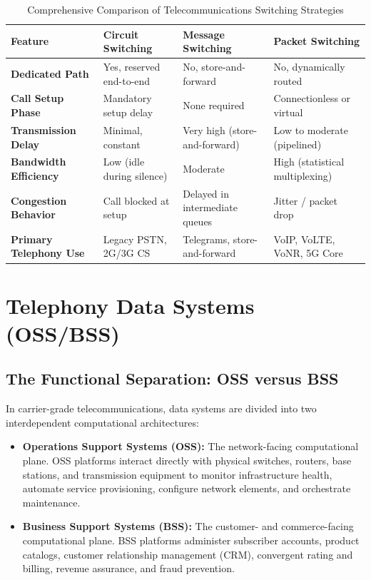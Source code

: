 \documentclass[12pt,a4paper]{report}
\begin{document}
\begin{table}[H]
\centering
\small
\renewcommand{\arraystretch}{1.3}
\begin{tabularx}{\textwidth}{|>{\bfseries}p{3.2cm}|>{\raggedright\arraybackslash}X|>{\raggedright\arraybackslash}X|>{\raggedright\arraybackslash}X|}
\hline
\textbf{Feature} & \textbf{Circuit Switching} & \textbf{Message Switching} & \textbf{Packet Switching} \\ \hline
\textbf{Dedicated Path} & Yes, reserved end-to-end & No, store-and-forward & No, dynamically routed \\ \hline
\textbf{Call Setup Phase} & Mandatory setup delay & None required & Connectionless or virtual \\ \hline
\textbf{Transmission Delay} & Minimal, constant & Very high (store-and-forward) & Low to moderate (pipelined) \\ \hline
\textbf{Bandwidth Efficiency} & Low (idle during silence) & Moderate & High (statistical multiplexing) \\ \hline
\textbf{Congestion Behavior} & Call blocked at setup & Delayed in intermediate queues & Jitter / packet drop \\ \hline
\textbf{Primary Telephony Use} & Legacy PSTN, 2G/3G CS & Telegrams, store-and-forward & VoIP, VoLTE, VoNR, 5G Core \\ \hline
\end{tabularx}
\caption{Comprehensive Comparison of Telecommunications Switching Strategies}
\label{tab:switching_comparison}
\end{table}

\chapter{Telephony Data Systems (OSS/BSS)}

\section{The Functional Separation: OSS versus BSS}
In carrier-grade telecommunications, data systems are divided into two interdependent computational architectures:
\begin{itemize}
    \item \textbf{Operations Support Systems (OSS):} The network-facing computational plane. OSS platforms interact directly with physical switches, routers, base stations, and transmission equipment to monitor infrastructure health, automate service provisioning, configure network elements, and orchestrate maintenance.
    \item \textbf{Business Support Systems (BSS):} The customer- and commerce-facing computational plane. BSS platforms administer subscriber accounts, product catalogs, customer relationship management (CRM), convergent rating and billing, revenue assurance, and fraud prevention.
\end{itemize}
\end{document}
